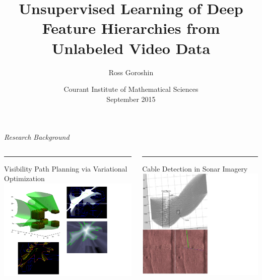 \documentclass{beamer}
\title{Unsupervised Learning of Deep Feature Hierarchies from Unlabeled Video Data}
\date{ Courant Institute of Mathematical Sciences \\ \vspace{0.2cm} September 2015}
\author{Ross Goroshin}
\begin{document}
\begin{frame}
\titlepage
\end{frame}

\begin{frame}
\begin{center} 
\huge \color{blue} \emph{Research Background}
\end{center} 
\end{frame} 

\begin{frame}
\begin{columns}[T] %
\begin{column}{.33\textwidth}
\color{blue}\rule{\linewidth}{2pt}
\tiny{Visibility Path Planning via Variational Optimization }
\includegraphics[scale=0.3,trim = 1 30 1 1, clip]{./Figures/vis.pdf}
\end{column}%
\hfill%
\begin{column}{.33\textwidth}
\color{blue}\rule{\linewidth}{2pt}
\tiny{Cable Detection in Sonar Imagery}
\centering
\includegraphics[scale=0.30,trim = 1 1 200 40, clip]{./Figures/cable.pdf}

\end{column}
\end{columns}
\end{frame}
\end{document}
